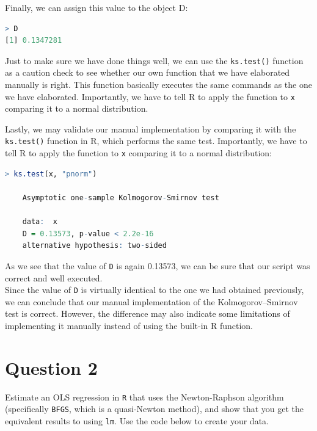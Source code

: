 \documentclass[12pt,letterpaper]{article}
\begin{document}
\noindent Finally, we can assign this value to the object D:

 

\begin{lstlisting}[language=R]
> D
[1] 0.1347281 \end{lstlisting}

\vspace{0.2in}

\noindent Just to make sure we have done things well, we can use the \texttt{ks.test()} function as a caution check to see whether our own function that we have elaborated manually is right. This function basically executes the same commands as the one we have elaborated. Importantly, we have to tell R to apply the function to \texttt{x} comparing it to a normal distribution.

\noindent Lastly, we may validate our manual implementation by comparing it with the \texttt{ks.test()} function in R, which performs the same test. Importantly, we have to tell R to apply the function to \texttt{x} comparing it to a normal distribution:

\begin{lstlisting}[language=R]
	> ks.test(x, "pnorm")
	
	Asymptotic one-sample Kolmogorov-Smirnov test
	
	data:  x
	D = 0.13573, p-value < 2.2e-16
	alternative hypothesis: two-sided \end{lstlisting}
\vspace{0.2in}
	
\noindent As we see that the value of \texttt{D} is again 0.13573, we can be sure that our script was correct and well executed.\\

\noindent Since the value of \texttt{D} is virtually identical to the one we had obtained previously, we can conclude that our manual implementation of the Kolmogorov–Smirnov test is correct. However, the difference may also indicate some limitations of implementing it manually instead of using the built-in R function.

\vspace{3in}

\section*{Question 2}
\noindent Estimate an OLS regression in \texttt{R} that uses the Newton-Raphson algorithm (specifically \texttt{BFGS}, which is a quasi-Newton method), and show that you get the equivalent results to using \texttt{lm}. Use the code below to create your data.
\vspace{0.5in}
\end{document}
